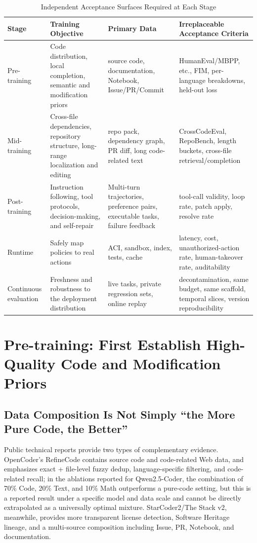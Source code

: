 \documentclass[10pt,a4paper,UTF8,fontset=none]{ctexart}
\begin{document}
\begin{table}[htbp]
\centering
\caption{Independent Acceptance Surfaces Required at Each Stage}
\label{en:tab:surfaces}
\small
\begin{tabularx}{\textwidth}{p{2.6cm}YYY}
\toprule
Stage & Training Objective & Primary Data & Irreplaceable Acceptance Criteria \\
\midrule
Pre-training & Code distribution, local completion, semantic and modification priors & source code, documentation, Notebook, Issue/PR/Commit & HumanEval/MBPP, etc., FIM, per-language breakdowns, held-out loss \\
Mid-training & Cross-file dependencies, repository structure, long-range localization and editing & repo pack, dependency graph, PR diff, long code-related text & CrossCodeEval, RepoBench, length buckets, cross-file retrieval/completion \\
Post-training & Instruction following, tool protocols, decision-making, and self-repair & Multi-turn trajectories, preference pairs, executable tasks, failure feedback & tool-call validity, loop rate, patch apply, resolve rate \\
Runtime & Safely map policies to real actions & ACI, sandbox, index, tests, cache & latency, cost, unauthorized-action rate, human-takeover rate, auditability \\
Continuous evaluation & Freshness and robustness to the deployment distribution & live tasks, private regression sets, online replay & decontamination, same budget, same scaffold, temporal slices, version reproducibility \\
\bottomrule
\end{tabularx}
\end{table}

\section{Pre-training: First Establish High-Quality Code and Modification Priors}

\subsection{Data Composition Is Not Simply ``the More Pure Code, the Better''}

Public technical reports provide two types of complementary evidence. OpenCoder's RefineCode contains source code and code-related Web data, and emphasizes exact + file-level fuzzy dedup, language-specific filtering, and code-related recall\cite{en:huang2024opencoder}; in the ablations reported for Qwen2.5-Coder, the combination of 70\% Code, 20\% Text, and 10\% Math outperforms a pure-code setting, but this is a reported result under a specific model and data scale and cannot be directly extrapolated as a universally optimal mixture\cite{en:hui2024qwen25coder}. StarCoder2/The Stack v2, meanwhile, provides more transparent license detection, Software Heritage lineage, and a multi-source composition including Issue, PR, Notebook, and documentation\cite{en:lozhkov2024starcoder2}.
\end{document}
